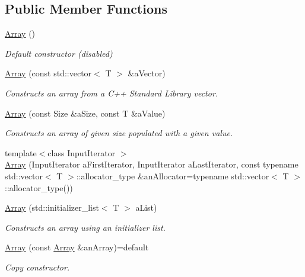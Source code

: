 \subsection*{Public Member Functions}
\begin{DoxyCompactItemize}
\item 
\hyperlink{classostk_1_1core_1_1ctnr_1_1_array_a4e10a5235b2fa8d420dc7fd30ebb081d}{Array} ()
\begin{DoxyCompactList}\small\item\em Default constructor (disabled) \end{DoxyCompactList}\item 
\hyperlink{classostk_1_1core_1_1ctnr_1_1_array_ad26e8cf9b109bc6c821c7408cac2935b}{Array} (const std\+::vector$<$ T $>$ \&a\+Vector)
\begin{DoxyCompactList}\small\item\em Constructs an array from a C++ Standard Library vector. \end{DoxyCompactList}\item 
\hyperlink{classostk_1_1core_1_1ctnr_1_1_array_ac4ff1f3f9c03f53963ad04dedd2addf2}{Array} (const Size \&a\+Size, const T \&a\+Value)
\begin{DoxyCompactList}\small\item\em Constructs an array of given size populated with a given value. \end{DoxyCompactList}\item 
{\footnotesize template$<$class Input\+Iterator $>$ }\\\hyperlink{classostk_1_1core_1_1ctnr_1_1_array_addf98739f6a298fadcd90c7ce11848b7}{Array} (Input\+Iterator a\+First\+Iterator, Input\+Iterator a\+Last\+Iterator, const typename std\+::vector$<$ T $>$\+::allocator\+\_\+type \&an\+Allocator=typename std\+::vector$<$ T $>$\+::allocator\+\_\+type())
\item 
\hyperlink{classostk_1_1core_1_1ctnr_1_1_array_a7e03bada8d56653599563f82d8dc9895}{Array} (std\+::initializer\+\_\+list$<$ T $>$ a\+List)
\begin{DoxyCompactList}\small\item\em Constructs an array using an initializer list. \end{DoxyCompactList}\item 
\hyperlink{classostk_1_1core_1_1ctnr_1_1_array_aea744c067ca9d3f22ef7798cb977b59f}{Array} (const \hyperlink{classostk_1_1core_1_1ctnr_1_1_array}{Array} \&an\+Array)=default
\begin{DoxyCompactList}\small\item\em Copy constructor. \end{DoxyCompactList}\item 

\end{DoxyCompactItemize}
